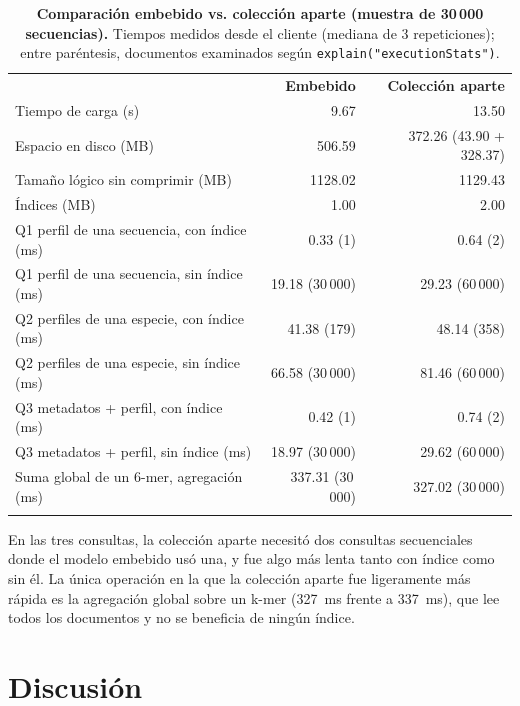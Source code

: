 \documentclass[pdflatex,sn-vancouver-num,lineno,referee]{sn-jnl}
\newcommand\cab[1]{{\color{white}\bfseries #1}}%
\newcommand\filasalternas{\rowcolors{2}{}{teClaro}}%
\begin{document}
\begin{table}[!ht]
\caption{\textbf{Comparación embebido vs. colección aparte (muestra de 30\,000 secuencias).}
Tiempos medidos desde el cliente (mediana de 3 repeticiones); entre
paréntesis, documentos examinados según \texttt{explain("executionStats")}.}
\filasalternas
\begin{tabular}{@{}lrr@{}}
\rowcolor{teOscuro}\cab{Métrica} & \cab{Embebido} & \cab{Colección aparte} \\
Tiempo de carga (s) & 9.67 & 13.50 \\
Espacio en disco (MB) & 506.59 & 372.26 (43.90 + 328.37) \\
Tamaño lógico sin comprimir (MB) & 1128.02 & 1129.43 \\
Índices (MB) & 1.00 & 2.00 \\
\midrule
Q1 perfil de una secuencia, con índice (ms) & 0.33 (1) & 0.64 (2) \\
Q1 perfil de una secuencia, sin índice (ms) & 19.18 (30\,000) & 29.23 (60\,000) \\
Q2 perfiles de una especie, con índice (ms) & 41.38 (179) & 48.14 (358) \\
Q2 perfiles de una especie, sin índice (ms) & 66.58 (30\,000) & 81.46 (60\,000) \\
Q3 metadatos + perfil, con índice (ms) & 0.42 (1) & 0.74 (2) \\
Q3 metadatos + perfil, sin índice (ms) & 18.97 (30\,000) & 29.62 (60\,000) \\
\midrule
Suma global de un 6-mer, agregación (ms) & 337.31 (30\,000) & 327.02 (30\,000) \\
\botrule
\end{tabular}
\label{tab:benchmark}
\end{table}

En las tres consultas, la colección aparte necesitó dos consultas
secuenciales donde el modelo embebido usó una, y fue algo más lenta tanto con
índice como sin él. La única operación en la que la colección aparte fue
ligeramente más rápida es la agregación global sobre un k-mer (327~ms frente
a 337~ms), que lee todos los documentos y no se beneficia de ningún índice.

\section{Discusión}\label{sec:discusion}
\end{document}
